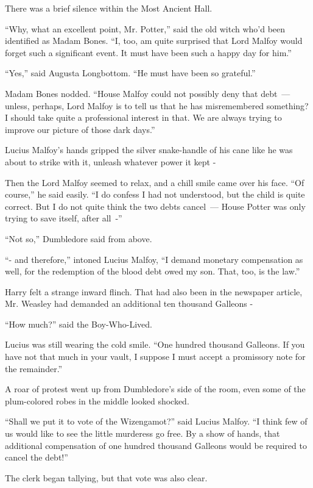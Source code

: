 There was a brief silence within the Most Ancient Hall.

``Why, what an excellent point, Mr. Potter,'' said the old witch who'd been identified as Madam Bones. ``I, too, am quite surprised that Lord Malfoy would forget such a significant event. It must have been such a happy day for him.''

``Yes,'' said Augusta Longbottom. ``He must have been so grateful.''

Madam Bones nodded. ``House Malfoy could not possibly deny that debt~--- unless, perhaps, Lord Malfoy is to tell us that he has misremembered something? I should take quite a professional interest in that. We are always trying to improve our picture of those dark days.''

Lucius Malfoy's hands gripped the silver snake-handle of his cane like he was about to strike with it, unleash whatever power it kept -

Then the Lord Malfoy seemed to relax, and a chill smile came over his face. ``Of course,'' he said easily. ``I do confess I had not understood, but the child is quite correct. But I do not quite think the two debts cancel~--- House Potter was only trying to save itself, after all~-''

``Not so,'' Dumbledore said from above.

``- and therefore,'' intoned Lucius Malfoy, ``I demand monetary compensation as well, for the redemption of the blood debt owed my son. That, too, is the law.''

Harry felt a strange inward flinch. That had also been in the newspaper article, Mr. Weasley had demanded an additional ten thousand Galleons -

``How much?'' said the Boy-Who-Lived.

Lucius was still wearing the cold smile. ``One hundred thousand Galleons. If you have not that much in your vault, I suppose I must accept a promissory note for the remainder.''

A roar of protest went up from Dumbledore's side of the room, even some of the plum-colored robes in the middle looked shocked.

``Shall we put it to vote of the Wizengamot?'' said Lucius Malfoy. ``I think few of us would like to see the little murderess go free. By a show of hands, that additional compensation of one hundred thousand Galleons would be required to cancel the debt!''

The clerk began tallying, but that vote was also clear.

